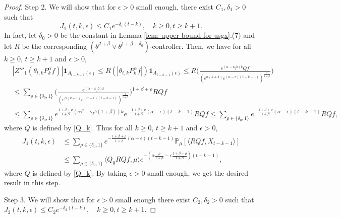 \documentclass[12pt,a4paper]{amsart}
\theoremstyle{plain}
\theoremstyle{definition}
\numberwithin{equation}{section}
\begin{document}
\begin{proof}
Step 2. We will show that for $\epsilon>0$ small enough, there exist  $C_1, \delta_1>0$ such that
\begin{equation}
  \label{lemma31q}
  J_1(t,k,\epsilon)
  \leq C_1e^{-\delta_1 (t-k)},
  \quad k\geq 0, t\geq k+1.
\end{equation}
In fact, let $\delta_0 >0$ be the constant in Lemma \ref{lem: upper bound for usgx}.(7) and let $R$ be the corresponding $(\theta^{2+\beta}\vee \theta^{1+\beta+\delta_0})$-controller.
Then, we have for all $k\geq 0$, $t\geq k+1$ and $\epsilon> 0$,
\begin{align}
  & |Z'''_1(\theta_{t,k}P^\alpha_k f)|\mathbf{1}_{A_{t-k-1}(\epsilon)}
    \leq R(|\theta_{t,k}P^\alpha_k f|)\mathbf{1}_{A_{t-k-1}(\epsilon)}
  \leq R \Big(\frac{e^{(\alpha-\kappa_fb)k} Qf}{(e^{\alpha (k+1)}e^{(\alpha-\epsilon)(t-k-1)})^\frac{1}{1+\beta}}\Big)
  \\ & \leq \sum_{\rho \in \{\delta_0, 1\}}\Big(\frac{e^{(\alpha-\kappa_fb)k}}{(e^{\alpha (k+1)}e^{(\alpha-\epsilon)(t-k-1)})^\frac{1}{1+\beta}}\Big)^{1+\beta+ \rho} RQf
  \\ & \leq\sum_{\rho \in \{\delta_0, 1\}}e^{\frac{1+\beta + \rho}{1+\beta}(\alpha\beta-\kappa_fb(1+\beta))k}e^{-\frac{1+\beta+\rho}{1+\beta} (\alpha-\epsilon)(t-k-1)}RQf
         \leq \sum_{\rho \in \{\delta_0,1\}}e^{-\frac{1+\beta+\rho}{1+\beta}(\alpha-\epsilon)(t-k-1)}RQf,
\end{align}
where $Q$ is defined by \eqref{Q_k}.
Thus for all $k\geq 0$, $t\geq k+1$ and $\epsilon> 0$,
\begin{align}
  \label{eq: estimate of J1}
  J_1(t,k,\epsilon)
  & \leq \sum_{\rho \in \{\delta_0,1\}}e^{-\frac{1+\beta+\rho}{1+\beta}(\alpha-\epsilon)(t-k-1)}\mathbb{P}_{\mu}[\langle RQf,X_{t-k-1}\rangle]\\
  & \leq \sum_{\rho \in \{\delta_0,1\}} \langle Q_0 RQf, \mu \rangle e^{-(\alpha\frac{\rho}{1+\beta}-\epsilon\frac{1+\beta+\rho}{1+\beta})(t-k-1)},
\end{align}
where $Q$ is defined by \eqref{Q_k}.
By taking $\epsilon>0$ small enough, we get the desired result in this step.

Step 3.
We will show that for $\epsilon>0$ small enough there exist $C_2, \delta_2>0$ such that
$
J_2(t,k,\epsilon)
\leq C_2e^{-\delta_2 (t-k)},
\quad k\geq 0, t\geq k+1.
$


\end{proof}
\end{document}
